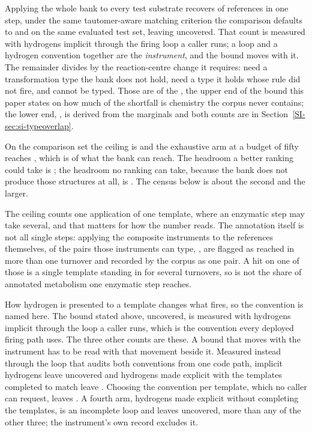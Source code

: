 Applying the whole bank to every test substrate recovers \numCeilingCoverage{} of references in
one step, under the same tautomer-aware matching criterion the comparison defaults to and on the
same evaluated test set, leaving \numCeilingUncovered{} uncovered. That count is measured with hydrogens implicit through the firing loop a caller runs; a loop and a hydrogen convention together are the \emph{instrument}, and the bound moves with it. The remainder divides by the reaction-centre change it requires: \numCeilingNovel{} need
a transformation type the bank does not hold, \numCeilingKnown{} need a type it holds whose rule
did not fire, and \numCeilingUntypeable{} cannot be typed. Those \numCeilingNovel{} are
\numBoundShortfallsharemax{} of the \numCeilingUncovered{}, the upper end of the bound this paper
states on how much of the shortfall is chemistry the corpus never contains; the lower end,
\numBoundShortfallsharemin{}, is derived from the marginals and both counts are in
Section~\ref{SI-sec:si-typeoverlap}.

On the comparison set the ceiling is \numHeadroomCeiling{} and the exhaustive
arm at a budget of fifty reaches \numHeadroomReached{}, which is \numHeadroomSharePct{} of what
the bank can reach. The headroom a better ranking could take is \numHeadroomRanking{}; the
headroom no ranking can take, because the bank does not produce those structures at all, is
\numHeadroomCoverage{}. The census below is about the second and the larger.

The ceiling counts one application of one template, where an enzymatic step may take several, and that matters for how the number reads. The
annotation itself is not all single steps: applying the composite instruments to the references themselves, \numRefstepEither{} of the \numRefstepTyped{} pairs those
instruments can type, \numRefstepEithersharePct{}, are flagged as reached in more than one
turnover and recorded by the corpus as one pair.  A hit on one of those is a single template standing in for
several turnovers, so \numCeilingCoverage{} is not the share of annotated metabolism one enzymatic
step reaches.

How hydrogen is presented to a template changes what fires, so the convention is named here.
The bound stated above, \numCeilingUncovered{} uncovered, is
measured with hydrogens implicit through the loop a caller runs, which is the convention every
deployed firing path uses. The three other counts are these. A bound that moves with the
instrument has to be read with that movement beside it.
Measured instead through the loop that audits both conventions from one code path, implicit
hydrogens leave \numCeilagreeAuditimplicitUncovered{} uncovered and hydrogens made explicit with
the templates completed to match leave \numCeilagreeAuditcompletedUncovered. Choosing the
convention per template, which no caller can request, leaves \numCeilagreeDispatchUncovered. A
fourth arm, hydrogens made explicit without completing the templates, is an incomplete loop and leaves \numHydUncoveredexpanded{} uncovered, more than any of the other
three; the instrument's own record excludes it.

